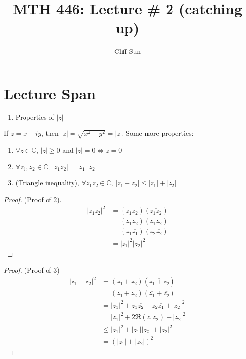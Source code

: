 \documentclass{article}
\title{MTH 446: Lecture \# 2 (catching up)}
\author{Cliff Sun}
\newtheorem{one minute paper}[theorem]{One Minute Paper}
\begin{document}
\maketitle

\section*{Lecture Span}
\begin{enumerate}
    \item Properties of $|z|$
\end{enumerate}

If $z = x + iy$, then $|z| = \sqrt{x^2 + y^2} = |\overline{z}|$. Some more properties:

\begin{enumerate}
    \item $\forall z \in \mathbb{C}$, $|z| \geq 0$ and $|z| = 0 \iff z = 0$
    \item $\forall z_1,z_2 \in \mathbb{C}$, $|z_1z_2| = |z_1||z_2|$
    \item (Triangle inequality), $\forall z_1z_2 \in \mathbb{C}$, $|z_1 + z_2| \leq |z_1| + |z_2|$
\end{enumerate}

\begin{proof}
    (Proof of 2). 
    \begin{align}
        |z_1z_2|^2 &= (z_1z_2)(\overline{z_1z_2}) \\
        &= (z_1z_2)(\overline{z_1}\overline{z_2}) \\
        &= (z_1 \overline{z_1})(z_2 \overline{z_2}) \\
        &= |z_1|^2|z_2|^2
    \end{align}
\end{proof}

\begin{proof}
    (Proof of 3)
    \begin{align}
        |z_1 + z_2|^2 &= (z_1 + z_2)(\overline{z_1 + z_2}) \\
        &= (z_1 + z_2)(\overline{z_1} + \overline{z_2}) \\
        &= |z_1|^2 + z_1\overline{z_2} + z_2\overline{z_1} + |z_2|^2\\
        &= |z_1|^2 + 2\Re(z_1z_2) + |z_2|^2\\
        &\leq |z_1|^2 + |z_1||z_2| + |z_2|^2\\
        &= (|z_1| + |z_2|)^2
    \end{align}
\end{proof}
\end{document}
